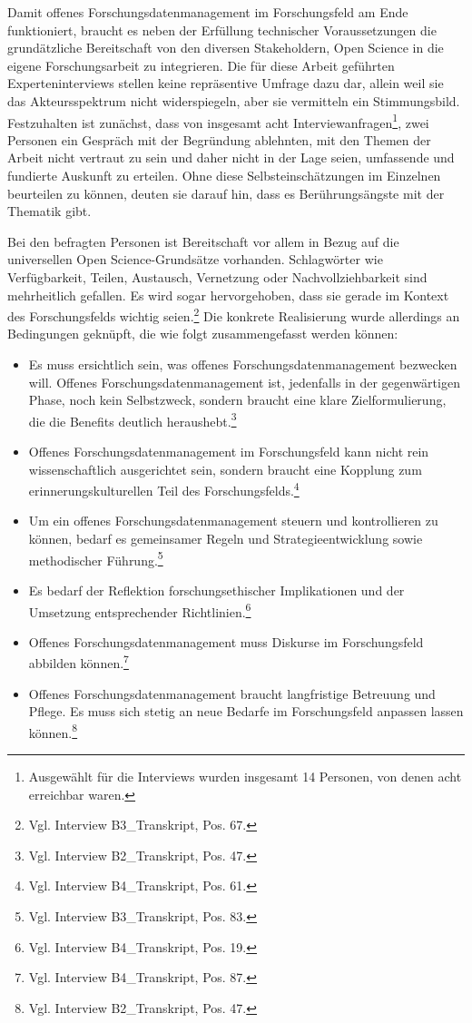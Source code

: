 Damit offenes Forschungsdatenmanagement im Forschungsfeld am Ende funktioniert, braucht es neben der Erfüllung technischer Voraussetzungen die grundätzliche Bereitschaft von den diversen Stakeholdern, Open Science in die eigene Forschungsarbeit zu integrieren. Die für diese Arbeit geführten Experteninterviews stellen keine repräsentive Umfrage dazu dar, allein weil sie das Akteursspektrum nicht widerspiegeln, aber sie vermitteln ein Stimmungsbild. Festzuhalten ist zunächst, dass von insgesamt acht Interviewanfragen\footnote{Ausgewählt für die Interviews wurden insgesamt 14 Personen, von denen acht erreichbar waren.}, zwei Personen ein Gespräch mit der Begründung ablehnten, mit den Themen der Arbeit nicht vertraut zu sein und daher nicht in der Lage seien, umfassende und fundierte Auskunft zu erteilen. Ohne diese Selbsteinschätzungen im Einzelnen beurteilen zu können, deuten sie darauf hin, dass es Berührungsängste mit der Thematik gibt.

Bei den befragten Personen ist Bereitschaft vor allem in Bezug auf die universellen Open Science-Grundsätze vorhanden. Schlagwörter wie Verfügbarkeit, Teilen, Austausch, Vernetzung oder Nachvollziehbarkeit sind mehrheitlich gefallen. Es wird sogar hervorgehoben, dass sie gerade im Kontext des Forschungsfelds wichtig seien.\footnote{Vgl. Interview B3\_Transkript, Pos. 67.} Die konkrete Realisierung wurde allerdings an Bedingungen geknüpft, die wie folgt zusammengefasst werden können:
\begin{itemize}
    \item Es muss ersichtlich sein, was offenes Forschungsdatenmanagement bezwecken will. Offenes Forschungsdatenmanagement ist, jedenfalls in der gegenwärtigen Phase, noch kein Selbstzweck, sondern braucht eine klare Zielformulierung, die die Benefits deutlich heraushebt.\footnote{Vgl. Interview B2\_Transkript, Pos. 47.}
    \item Offenes Forschungsdatenmanagement im Forschungsfeld kann nicht rein wissenschaftlich ausgerichtet sein, sondern braucht eine Kopplung zum erinnerungskulturellen Teil des Forschungsfelds.\footnote{Vgl. Interview B4\_Transkript, Pos. 61.}
    \item Um ein offenes Forschungsdatenmanagement steuern und kontrollieren zu können, bedarf es gemeinsamer Regeln und Strategieentwicklung sowie methodischer Führung.\footnote{Vgl. Interview B3\_Transkript, Pos. 83.}
    \item Es bedarf der Reflektion forschungsethischer Implikationen und der Umsetzung entsprechender Richtlinien.\footnote{Vgl. Interview B4\_Transkript, Pos. 19.}
    \item Offenes Forschungsdatenmanagement muss Diskurse im Forschungsfeld abbilden können.\footnote{Vgl. Interview B4\_Transkript, Pos. 87.} 
    \item Offenes Forschungsdatenmanagement braucht langfristige Betreuung und Pflege. Es muss sich stetig an neue Bedarfe im Forschungsfeld anpassen lassen können.\footnote{Vgl. Interview B2\_Transkript, Pos. 47.}
\end{itemize}


